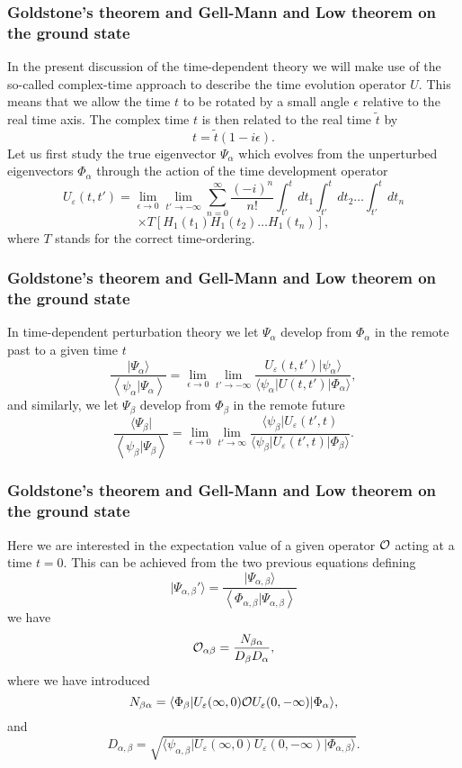 \documentclass[compress]{beamer}
\newcommand*{\ket}[1]{|#1\rangle}
\newcommand*{\bra}[1]{\langle#1|}
\begin{document}
{
\frametitle{Goldstone's theorem and Gell-Mann and Low theorem on the ground state}
\begin{small}
{\scriptsize
In the present discussion of the time-dependent theory we will make
use of the so-called complex-time approach to describe the time
evolution operator $U$.
This means that we
allow the time $t$ to be rotated by a small angle $\epsilon$
relative to the real time axis. The complex time $t$ is then
related to the real time $\tilde{t}$ by
\[
t=\tilde{t}(1-i\epsilon ).
\]
Let us first study the true eigenvector $\Psi_{\alpha}$ which evolves
from the unperturbed eigenvectors $\Phi_{\alpha}$ through the action of the
time development operator
\[
   U_{\varepsilon}(t,t')=\lim_{\epsilon \rightarrow 0}
   \lim_{t'\rightarrow -\infty}
   {\displaystyle\sum_{n=0}^{\infty}\frac{(-i)^n}{n!}
   \int_{t'}^{t}dt_1  \int_{t'}^{t}dt_2\dots  \int_{t'}^{t}dt_n}
\]
\[
	      \times T\left[H_1(t_1)H_1(t_2)\dots H_1(t_n)\right],
\]
where $T$ stands for the correct time-ordering.
}
\end{small}
}
\frame
{
\frametitle{Goldstone's theorem and Gell-Mann and Low theorem on the ground state}
\begin{small}
{\scriptsize
In time-dependent
perturbation theory we let $\Psi_{\alpha}$ develop from $\Phi_{\alpha}$ in the
remote past to a given time $t$
\[
    \frac{\ket{\Psi_{\alpha}}}
    {\left\langle\psi_{\alpha} | \Psi_{\alpha} \right\rangle}=
    \lim_{\epsilon \rightarrow 0}
   \lim_{t'\rightarrow -\infty}
   \frac{U_{\varepsilon}(t,t' )\ket{\psi_{\alpha}} }
   { \bra{\psi_{\alpha}} U(t,t' )\ket{\Phi_{\alpha}} },
\]
and similarly, we let
$\Psi_{\beta}$ develop from $\Phi_{\beta}$ in the remote future
\[
    \frac{\bra{\Psi_{\beta}}}{\left\langle
    \psi_{\beta} | \Psi_{\beta} \right\rangle}=
    \lim_{\epsilon \rightarrow 0}
    \lim_{t'\rightarrow \infty}
    \frac{\bra{\psi_{\beta}}U_{\varepsilon}(t' ,t) }
    { \bra{\psi_{\beta}} U_{\varepsilon}(t' ,t)\ket{\Phi_{\beta}} }.
\]
}
\end{small}
}
\frame
{
\frametitle{Goldstone's theorem and Gell-Mann and Low theorem on the ground state}
\begin{small}
{\scriptsize
Here we are interested in the expectation value of a given
operator ${\cal O}$ acting at a time $t=0$. This can be achieved
from the two previous equations defining
\[
     \ket{\Psi_{\alpha ,\beta}'}=
     \frac{\ket{\Psi_{\alpha ,\beta}}}
     {\left\langle\Phi_{\alpha ,\beta} | \Psi_{\alpha ,\beta} \right\rangle}
\]
we have
\[
   {\cal O}_{\alpha\beta}
  =\frac{N_{\beta\alpha}}{D_{\beta}D_{\alpha}},
\]
where we have introduced
\[
   N_{\beta\alpha}=
   \bra{\Phi_{\beta}}U_{\varepsilon}(\infty ,0){\cal O}U_{\varepsilon}(0,-\infty )\ket{\Phi_{\alpha}} ,
\]
and 
\[
   D_{\alpha ,\beta}=
   \sqrt{\bra{\psi_{\alpha ,\beta}}
   U_{\varepsilon}(\infty ,0)U_{\varepsilon}(0,-\infty )\ket{\Phi_{\alpha ,\beta}}}. 
\]
}
\end{small}
}
\end{document}
